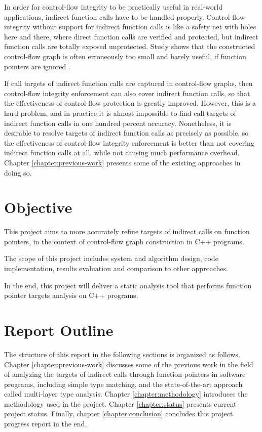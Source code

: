 In order for control-flow integrity to be practically useful in real-world applications, indirect function calls have to be handled properly. Control-flow integrity without support for indirect function calls is like a safety net with holes here and there, where direct function calls are verified and protected, but indirect function calls are totally exposed unprotected. Study shows that the constructed control-flow graph is often erroneously too small and barely useful, if function pointers are ignored \cite{cfg-extract}.

If call targets of indirect function calls are captured in control-flow graphs, then control-flow integrity enforcement can also cover indirect function calls, so that the effectiveness of control-flow protection is greatly improved. However, this is a hard problem, and in practice it is almost impossible to find call targets of indirect function calls in one hundred percent accuracy. Nonetheless, it is desirable to resolve targets of indirect function calls as precisely as possible, so the effectiveness of control-flow integrity enforcement is better than not covering indirect function calls at all, while not causing much performance overhead. Chapter \ref{chapter:previous-work} presents some of the existing approaches in doing so.

\section{Objective}
\label{section:objective}

This project aims to more accurately refine targets of indirect calls on function pointers, in the context of control-flow graph construction in C++ programs.

The scope of this project includes system and algorithm design, code implementation, results evaluation and comparison to other approaches.

In the end, this project will deliver a static analysis tool that performs function pointer targets analysis on C++ programs.

\section{Report Outline}
\label{section:outline}

The structure of this report in the following sections is organized as follows. Chapter \ref{chapter:previous-work} discusses some of the previous work in the field of analyzing the targets of indirect calls through function pointers in software programs, including simple type matching, and the state-of-the-art approach called multi-layer type analysis. Chapter \ref{chapter:methodology} introduces the methodology used in the project. Chapter \ref{chapter:status} presents current project status. Finally, chapter \ref{chapter:conclusion} concludes this project progress report in the end.